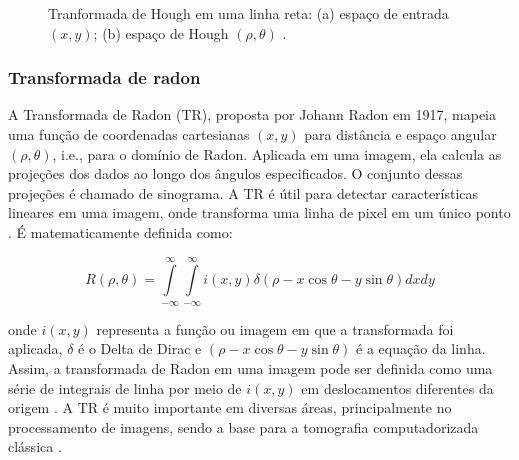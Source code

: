 \documentclass[12pt, a4paper, english, brazil]{article}
\begin{document}
\begin{figure}[ht]
    \centering
    \caption{Tranformada de Hough em uma linha reta: (a) espaço de entrada $(x,y)$; (b) espaço de Hough $(\rho, \theta)$ \cite{Lin_Otobe_2001}.}
    \label{fig:tHough}
\end{figure}

\subsubsection{Transformada de radon}

A Transformada de Radon (TR), proposta por Johann Radon em 1917, mapeia uma função de coordenadas cartesianas $(x, y)$ para distância e espaço angular $(\rho, \theta)$, i.e., para o domínio de Radon. Aplicada em uma imagem, ela calcula as projeções dos dados ao longo dos ângulos especificados. O conjunto dessas projeções é chamado de sinograma. A TR é útil para detectar características lineares em uma imagem, onde transforma uma linha de pixel em um único ponto \cite{Kaur_Sahambi_2015}. É matematicamente definida como:

\begin{equation}
R(\rho, \theta) = \int\limits _{-\infty}^\infty \int\limits _{-\infty}^\infty i (x, y) \delta (\rho - x\cos \theta - y\sin \theta ) dxdy
\end{equation}

onde $i (x, y)$ representa a função ou imagem em que a transformada foi aplicada, $\delta$ é o Delta de Dirac e $(\rho - x\cos \theta - y\sin \theta)$ é a equação da linha. Assim, a transformada de Radon em uma imagem pode ser definida como uma série de integrais de linha por meio de $i (x, y)$ em deslocamentos diferentes da origem \cite{Li_2019}. A TR é muito importante em diversas áreas, principalmente no processamento de imagens, sendo a base para a tomografia computadorizada clássica \cite{Silva_Escarpinati_Backes_2021}.
\end{document}
